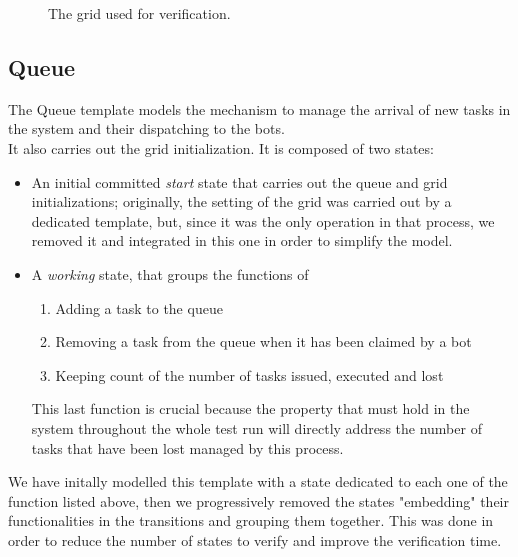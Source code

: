 \documentclass{article}
\begin{document}
\begin{figure}[H]
\begin{minipage}{0.45\textwidth}
						\caption{The grid used for verification.}
					\end{minipage}
				\end{figure}

		\subsection{Queue}
			The Queue template models the mechanism to manage the arrival of new tasks in the system and their dispatching to the bots.\\
			It also carries out the grid initialization. It is composed of two states:
			\begin{itemize}
				\item An initial committed \emph{start} state that carries out the queue and grid initializations; originally, the setting of the grid was carried out by a dedicated template, but, since it was the only operation in that process, we removed it and integrated in this one in order to simplify the model.
				\item A \emph{working} state, that groups the functions of
					\begin{enumerate}
						\item Adding a task to the queue
						\item Removing a task from the queue when it has been claimed by a bot
						\item Keeping count of the number of tasks issued, executed and lost
					\end{enumerate}
					This last function is crucial because the property that must hold in the system throughout the whole test run will directly address the number of tasks that have been lost managed by this process.
			\end{itemize}
			We have initally modelled this template with a state dedicated to each one of the function listed above, then we progressively removed the states "embedding" their functionalities in the transitions and grouping them together. This was done in order to reduce the number of states to verify and improve the verification time. 
		
\end{document}
